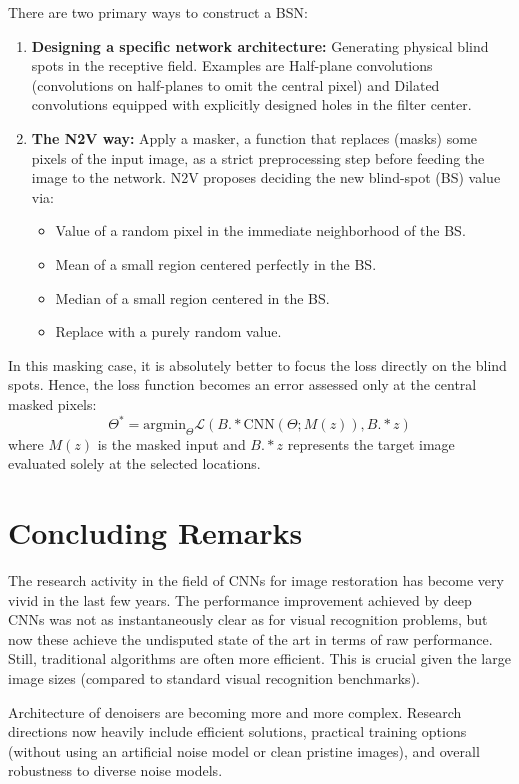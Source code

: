 There are two primary ways to construct a BSN:
\begin{enumerate}
    \item \textbf{Designing a specific network architecture:} Generating physical blind spots in the receptive field. Examples are Half-plane convolutions (convolutions on half-planes to omit the central pixel) and Dilated convolutions equipped with explicitly designed holes in the filter center.
    \item \textbf{The N2V way:} Apply a masker, a function that replaces (masks) some pixels of the input image, as a strict preprocessing step before feeding the image to the network. N2V proposes deciding the new blind-spot (BS) value via:
    \begin{itemize}
        \item Value of a random pixel in the immediate neighborhood of the BS.
        \item Mean of a small region centered perfectly in the BS.
        \item Median of a small region centered in the BS.
        \item Replace with a purely random value.
    \end{itemize}
\end{enumerate}

In this masking case, it is absolutely better to focus the loss directly on the blind spots. Hence, the loss function becomes an error assessed only at the central masked pixels:
\begin{equation}
    \Theta^* = \text{argmin}_\Theta \mathcal{L}(B .* \text{CNN}(\Theta; M(z)), B .* z)
\end{equation}
where $M(z)$ is the masked input and $B .* z$ represents the target image evaluated solely at the selected locations.

\section{Concluding Remarks}
The research activity in the field of CNNs for image restoration has become very vivid in the last few years. The performance improvement achieved by deep CNNs was not as instantaneously clear as for visual recognition problems, but now these achieve the undisputed state of the art in terms of raw performance. Still, traditional algorithms are often more efficient. This is crucial given the large image sizes (compared to standard visual recognition benchmarks).

Architecture of denoisers are becoming more and more complex. Research directions now heavily include efficient solutions, practical training options (without using an artificial noise model or clean pristine images), and overall robustness to diverse noise models.

